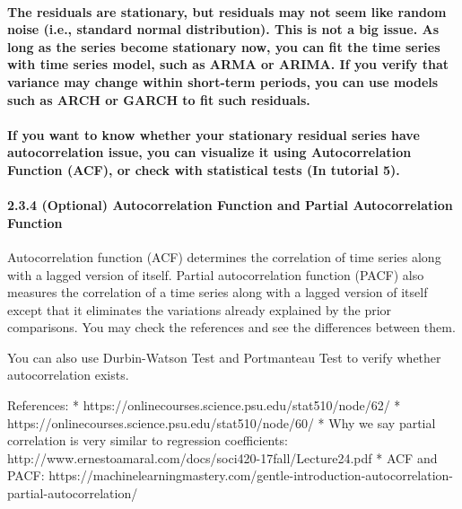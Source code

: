 \documentclass[11pt]{article}
\begin{document}
    \paragraph{The residuals are stationary, but residuals may not seem like
random noise (i.e., standard normal distribution). This is not a big
issue. As long as the series become stationary now, you can fit the time
series with time series model, such as ARMA or ARIMA. If you verify that
variance may change within short-term periods, you can use models such
as ARCH or GARCH to fit such
residuals.}\label{the-residuals-are-stationary-but-residuals-may-not-seem-like-random-noise-i.e.-standard-normal-distribution.-this-is-not-a-big-issue.-as-long-as-the-series-become-stationary-now-you-can-fit-the-time-series-with-time-series-model-such-as-arma-or-arima.-if-you-verify-that-variance-may-change-within-short-term-periods-you-can-use-models-such-as-arch-or-garch-to-fit-such-residuals.}

\paragraph{If you want to know whether your stationary residual series
have autocorrelation issue, you can visualize it using Autocorrelation
Function (ACF), or check with statistical tests (In tutorial
5).}\label{if-you-want-to-know-whether-your-stationary-residual-series-have-autocorrelation-issue-you-can-visualize-it-using-autocorrelation-function-acf-or-check-with-statistical-tests-in-tutorial-5.}

    \paragraph{2.3.4 (Optional) Autocorrelation Function and Partial
Autocorrelation
Function}\label{optional-autocorrelation-function-and-partial-autocorrelation-function}

Autocorrelation function (ACF) determines the correlation of time series
along with a lagged version of itself. Partial autocorrelation function
(PACF) also measures the correlation of a time series along with a
lagged version of itself except that it eliminates the variations
already explained by the prior comparisons. You may check the references
and see the differences between them.

You can also use Durbin-Watson Test and Portmanteau Test to verify
whether autocorrelation exists.

References: * https://onlinecourses.science.psu.edu/stat510/node/62/ *
https://onlinecourses.science.psu.edu/stat510/node/60/ * Why we say
partial correlation is very similar to regression coefficients:
http://www.ernestoamaral.com/docs/soci420-17fall/Lecture24.pdf * ACF and
PACF:
https://machinelearningmastery.com/gentle-introduction-autocorrelation-partial-autocorrelation/
\end{document}
